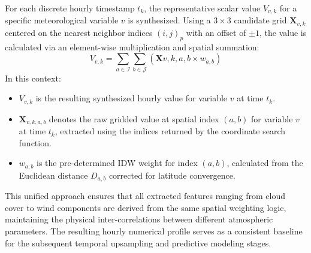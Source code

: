 \documentclass[conference]{IEEEtran}
\begin{document}
\begin{itemize}
	For each discrete hourly timestamp $t_k$, the representative scalar value $V_{v,k}$ for a specific meteorological variable $v$ is synthesized. Using a $3 \times 3$ candidate grid $\mathbf{X}_{v,k}$ centered on the nearest neighbor indices $(i, j)_p$ with an offset of $\pm 1$, the value is calculated via an element-wise multiplication and spatial summation:
	\begin{equation} 
		V_{v,k} = \sum_{a \in \mathcal{I}} \sum_{b \in \mathcal{J}} (\mathbf{X}{v, k, a, b} \times w_{a,b}) 
	\end{equation}
	In this context:
	\begin{itemize}
		\item $V_{v,k}$ is the resulting synthesized hourly value for variable $v$ at time $t_k$.
		\item $\mathbf{X}_{v,k,a,b}$ denotes the raw gridded value at spatial index $(a, b)$ for variable $v$ at time $t_k$, extracted using the indices returned by the coordinate search function.
		\item $w_{a,b}$ is the pre-determined IDW weight for index $(a, b)$, calculated from the Euclidean distance $D_{a,b}$ corrected for latitude convergence.
	\end{itemize}
	This unified approach ensures that all extracted features ranging from cloud cover to wind components are derived from the same spatial weighting logic, maintaining the physical inter-correlations between different atmospheric parameters. The resulting hourly numerical profile serves as a consistent baseline for the subsequent temporal upsampling and predictive modeling stages.
	

\end{itemize}
\end{document}
